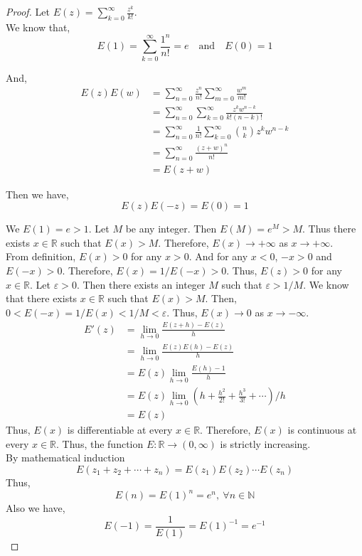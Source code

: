 \begin{proof}
	Let $\displaystyle E(z) = \sum_{k=0}^\infty \frac{z^k}{k!}$.\\

	We know that,	
	\[ E(1) = \sum_{k=0}^\infty \frac{1^n}{n!} = e \quad \text{and} \quad E(0) = 1 \]

	And,
	\begin{align*}
		E(z)E(w) & = \sum_{n=0}^\infty \frac{z^n}{n!} \sum_{m=0}^\infty \frac{w^m}{m!} \\
		& = \sum_{n=0}^\infty \sum_{k=0}^\infty \frac{z^k w^{n-k}}{k!(n-k)!}  \\
		& = \sum_{n=0}^\infty \frac{1}{n!} \sum_{k=0}^\infty \binom{n}{k} z^k w^{n-k} \\
		& = \sum_{n=0}^\infty \frac{(z+w)^n}{n!} \\
		& = E(z+w)
	\end{align*}

	Then we have,
	\[ E(z)E(-z) = E(0) = 1 \]

	We $E(1) = e > 1$.
	Let $M$ be any integer.
	Then $E(M) = e^M > M$.
	Thus there exists $x \in \mathbb{R}$ such that $E(x) > M$.
	Therefore, $E(x) \to +\infty$ as $x \to +\infty$.\\

	From definition, $E(x) > 0$ for any $x > 0$.
	And for any $x < 0$, $-x > 0$ and $E(-x) > 0$.
	Therefore, $E(x) = 1/E(-x) > 0$.
	Thus, $E(z) > 0$ for any $x \in \mathbb{R}$.
	Let $\varepsilon > 0$.
	Then there exists an integer $M$ such that $\varepsilon > 1/M$.
	We know that there exists $x \in \mathbb{R}$ such that $E(x) > M$.
	Then, $0 < E(-x) = 1/E(x) < 1/M < \varepsilon$.
	Thus, $E(x) \to 0$ as $x \to -\infty$.\\

	\begin{align*}
		E'(z) & = \lim_{h \to 0} \frac{E(z+h)-E(z)}{h} \\
		& = \lim_{h \to 0} \frac{E(z)E(h) - E(z)}{h} \\
		& = E(z) \lim_{h \to 0} \frac{E(h)-1}{h} \\
		& = E(z) \lim_{h \to 0} (h+\frac{h^2}{2!}+\frac{h^3}{3!} + \dotsb )/ h \\
		& = E(z) 
	\end{align*}
	Thus, $E(x)$ is differentiable at every $x \in \mathbb{R}$.
	Therefore, $E(x)$ is continuous at every $x \in \mathbb{R}$.
	Thus, the function $E : \mathbb{R} \to (0,\infty)$ is strictly increasing.\\

	By mathematical induction
	\[ E(z_1 + z_2 + \dotsb + z_n) = E(z_1) E(z_2) \dotsm E(z_n) \]
	Thus,
	\[ E(n) = E(1)^n = e^n,\ \forall n \in \mathbb{N} \]
	Also we have,
	\[ E(-1) = \frac{1}{E(1)} = E(1)^{-1} = e^{-1} \]


\end{proof}

